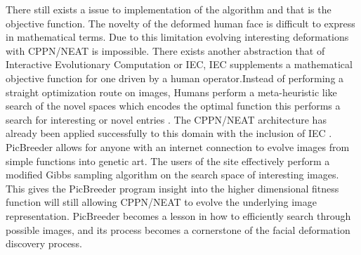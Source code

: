 There still exists a issue to implementation of the algorithm and that is the objective function. The novelty of the deformed human face is 
difficult to express in mathematical terms. Due to this limitation evolving interesting deformations with CPPN/NEAT is impossible.
There exists another abstraction that of Interactive Evolutionary Computation or IEC, IEC supplements a mathematical objective function
for one driven by a human operator.Instead of performing a straight optimization route on images, Humans perform a meta-heuristic like search of the novel
spaces which encodes the optimal function this performs a search for interesting or novel entries \cite{lehman2010efficiently} \cite{li2009innovative}.  The CPPN/NEAT architecture has already been applied successfully to this domain with the inclusion of IEC \cite{secretan2008picbreeder}. PicBreeder allows for anyone with an internet connection to evolve images from simple functions into genetic art. The users of the site effectively
perform a modified Gibbs sampling algorithm on the search space of interesting images. This gives the PicBreeder program insight
into the higher dimensional fitness function will still allowing CPPN/NEAT to evolve the underlying image representation. PicBreeder
becomes a lesson in how to efficiently search through possible images, and its process becomes a cornerstone of the facial
deformation discovery process.